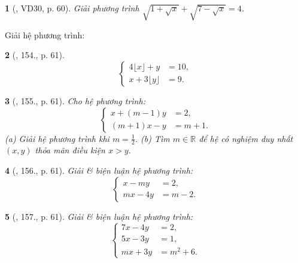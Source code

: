 \documentclass{article}
\newtheorem{baitoan}{}
\begin{document}
\begin{baitoan}[\cite{Tuyen_Toan_9_old}, VD30, p. 60]
	Giải phương trình $\sqrt{1 + \sqrt{x}} + \sqrt{7 - \sqrt{x}} = 4$.
\end{baitoan}
Giải hệ phương trình:

\begin{baitoan}[\cite{Tuyen_Toan_9_old}, 154., p. 61]
	\begin{equation*}
		\left\{\begin{split}
			4\lfloor x\rfloor + y &= 10,\\
			x + 3\lfloor y\rfloor &= 9.
		\end{split}\right.
	\end{equation*}
\end{baitoan}

\begin{baitoan}[\cite{Tuyen_Toan_9_old}, 155., p. 61]
	Cho hệ phương trình:
	\begin{equation*}
		\left\{\begin{split}
			x + (m - 1)y &= 2,\\
			(m + 1)x - y &= m + 1.
		\end{split}\right.
	\end{equation*}
	(a) Giải hệ phương trình khi $m = \frac{1}{2}$. (b) Tìm $m\in\mathbb{R}$ để hệ có nghiệm duy nhất $(x,y)$ thỏa mãn điều kiện $x > y$.
\end{baitoan}

\begin{baitoan}[\cite{Tuyen_Toan_9_old}, 156., p. 61]
	Giải \& biện luận hệ phương trình:
	\begin{equation*}
		\left\{\begin{split}
			x - my &= 2,\\
			mx - 4y &= m - 2.
		\end{split}\right.
	\end{equation*}
\end{baitoan}

\begin{baitoan}[\cite{Tuyen_Toan_9_old}, 157., p. 61]
	Giải \& biện luận hệ phương trình:
	\begin{equation*}
		\left\{\begin{split}
			7x - 4y &= 2,\\
			5x - 3y &= 1,\\
			mx + 3y &= m^2 + 6.
		\end{split}\right.
	\end{equation*}
\end{baitoan}
\end{document}
